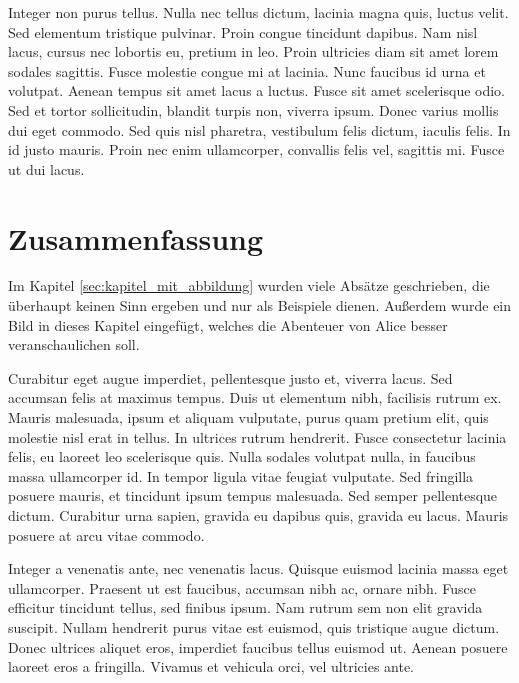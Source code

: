 \documentclass[12pt, a4paper]{article}
\begin{document}
Integer non purus tellus. Nulla nec tellus dictum, lacinia magna quis, luctus velit. Sed elementum tristique pulvinar. Proin congue tincidunt dapibus. Nam nisl lacus, cursus nec lobortis eu, pretium in leo. Proin ultricies diam sit amet lorem sodales sagittis. Fusce molestie congue mi at lacinia. Nunc faucibus id urna et volutpat. Aenean tempus sit amet lacus a luctus. Fusce sit amet scelerisque odio. Sed et tortor sollicitudin, blandit turpis non, viverra ipsum. Donec varius mollis dui eget commodo. Sed quis nisl pharetra, vestibulum felis dictum, iaculis felis. In id justo mauris. Proin nec enim ullamcorper, convallis felis vel, sagittis mi. Fusce ut dui lacus.

\section{Zusammenfassung}

Im Kapitel \ref{sec:kapitel_mit_abbildung} wurden viele Absätze geschrieben, die überhaupt keinen Sinn ergeben und nur als Beispiele dienen. Außerdem wurde ein Bild in dieses Kapitel eingefügt, welches die Abenteuer von Alice besser veranschaulichen soll.

Curabitur eget augue imperdiet, pellentesque justo et, viverra lacus. Sed accumsan felis at maximus tempus. Duis ut elementum nibh, facilisis rutrum ex. Mauris malesuada, ipsum et aliquam vulputate, purus quam pretium elit, quis molestie nisl erat in tellus. In ultrices rutrum hendrerit. Fusce consectetur lacinia felis, eu laoreet leo scelerisque quis. Nulla sodales volutpat nulla, in faucibus massa ullamcorper id. In tempor ligula vitae feugiat vulputate. Sed fringilla posuere mauris, et tincidunt ipsum tempus malesuada. Sed semper pellentesque dictum. Curabitur urna sapien, gravida eu dapibus quis, gravida eu lacus. Mauris posuere at arcu vitae commodo.

Integer a venenatis ante, nec venenatis lacus. Quisque euismod lacinia massa eget ullamcorper. Praesent ut est faucibus, accumsan nibh ac, ornare nibh. Fusce efficitur tincidunt tellus, sed finibus ipsum. Nam rutrum sem non elit gravida suscipit. Nullam hendrerit purus vitae est euismod, quis tristique augue dictum. Donec ultrices aliquet eros, imperdiet faucibus tellus euismod ut. Aenean posuere laoreet eros a fringilla. Vivamus et vehicula orci, vel ultricies ante.

\clearpage
\printbibliography[heading=bibintoc]

\clearpage
\listoffigures
{}

\end{document}
